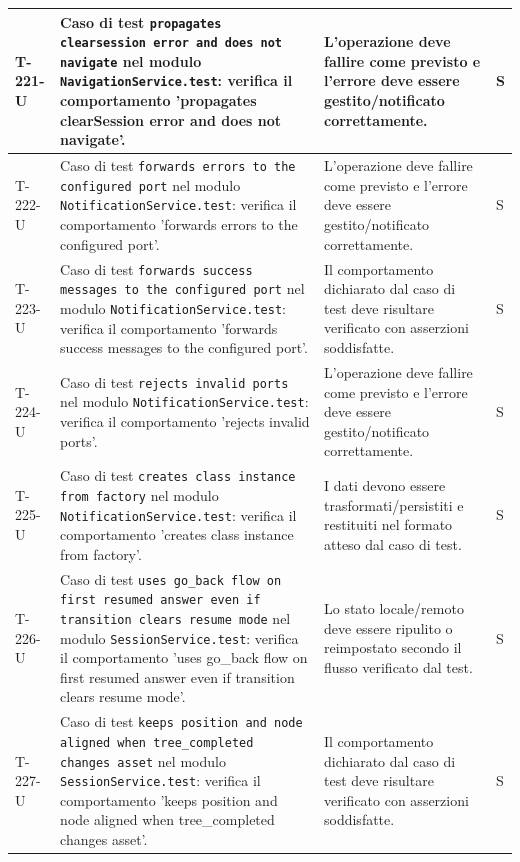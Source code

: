 \documentclass[a4paper,12pt]{article}
\begin{document}
{{\begin{longtable}{|>{\RaggedRight\arraybackslash}p{1.55cm}|>{\RaggedRight\arraybackslash}p{8.0cm}|>{\RaggedRight\arraybackslash}p{4.6cm}|>{\RaggedRight\arraybackslash}p{1.2cm}|}
        T-221-U & Caso di test \texttt{propagates clearsession error and does not navigate} nel modulo \texttt{NavigationService.test}: verifica il comportamento 'propagates clearSession error and does not navigate'. & L'operazione deve fallire come previsto e l'errore deve essere gestito/notificato correttamente. & S \\
        \hline
        T-222-U & Caso di test \texttt{forwards errors to the configured port} nel modulo \texttt{NotificationService.test}: verifica il comportamento 'forwards errors to the configured port'. & L'operazione deve fallire come previsto e l'errore deve essere gestito/notificato correttamente. & S \\
        \hline
        T-223-U & Caso di test \texttt{forwards success messages to the configured port} nel modulo \texttt{NotificationService.test}: verifica il comportamento 'forwards success messages to the configured port'. & Il comportamento dichiarato dal caso di test deve risultare verificato con asserzioni soddisfatte. & S \\
        \hline
        T-224-U & Caso di test \texttt{rejects invalid ports} nel modulo \texttt{NotificationService.test}: verifica il comportamento 'rejects invalid ports'. & L'operazione deve fallire come previsto e l'errore deve essere gestito/notificato correttamente. & S \\
        \hline
        T-225-U & Caso di test \texttt{creates class instance from factory} nel modulo \texttt{NotificationService.test}: verifica il comportamento 'creates class instance from factory'. & I dati devono essere trasformati/persistiti e restituiti nel formato atteso dal caso di test. & S \\
        \hline
        T-226-U & Caso di test \texttt{uses go\_back flow on first resumed answer even if transition clears resume mode} nel modulo \texttt{SessionService.test}: verifica il comportamento 'uses go\_back flow on first resumed answer even if transition clears resume mode'. & Lo stato locale/remoto deve essere ripulito o reimpostato secondo il flusso verificato dal test. & S \\
        \hline
        T-227-U & Caso di test \texttt{keeps position and node aligned when tree\_completed changes asset} nel modulo \texttt{SessionService.test}: verifica il comportamento 'keeps position and node aligned when tree\_completed changes asset'. & Il comportamento dichiarato dal caso di test deve risultare verificato con asserzioni soddisfatte. & S \\
        \hline

\end{longtable}}}
\end{document}
